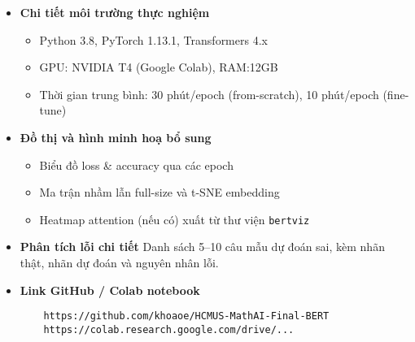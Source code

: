 \begin{itemize}
    \item \textbf{Chi tiết môi trường thực nghiệm}  
    \begin{itemize}
      \item Python 3.8, PyTorch 1.13.1, Transformers 4.x  
      \item GPU: NVIDIA T4 (Google Colab), RAM:12GB  
      \item Thời gian trung bình: 30 phút/epoch (from-scratch), 10 phút/epoch (fine-tune)
    \end{itemize}
    
    \item \textbf{Đồ thị và hình minh hoạ bổ sung}  
    \begin{itemize}
      \item Biểu đồ loss \& accuracy qua các epoch  
      \item Ma trận nhầm lẫn full-size và t-SNE embedding  
      \item Heatmap attention (nếu có) xuất từ thư viện \texttt{bertviz}
    \end{itemize}
    
    \item \textbf{Phân tích lỗi chi tiết}  
    Danh sách 5–10 câu mẫu dự đoán sai, kèm nhãn thật, nhãn dự đoán và nguyên nhân lỗi.
    
    \item \textbf{Link GitHub / Colab notebook}  
    \begin{verbatim}
    https://github.com/khoaoe/HCMUS-MathAI-Final-BERT
    https://colab.research.google.com/drive/...
    \end{verbatim}
\end{itemize}